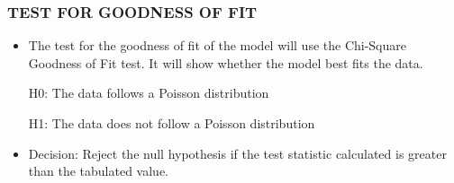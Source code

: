 \begin{frame}
\frametitle{TEST FOR GOODNESS OF FIT}
\begin{itemize}
\item The test for the goodness of fit of the model will use the Chi-Square Goodness of Fit test.  It will show whether the model best fits the data.
	 
	H0: The data follows a Poisson distribution
	
	H1: The data does not follow a Poisson distribution
	
\item Decision: Reject the null hypothesis if the test statistic calculated is greater than the tabulated value. 
\end{itemize}
\end{frame}
